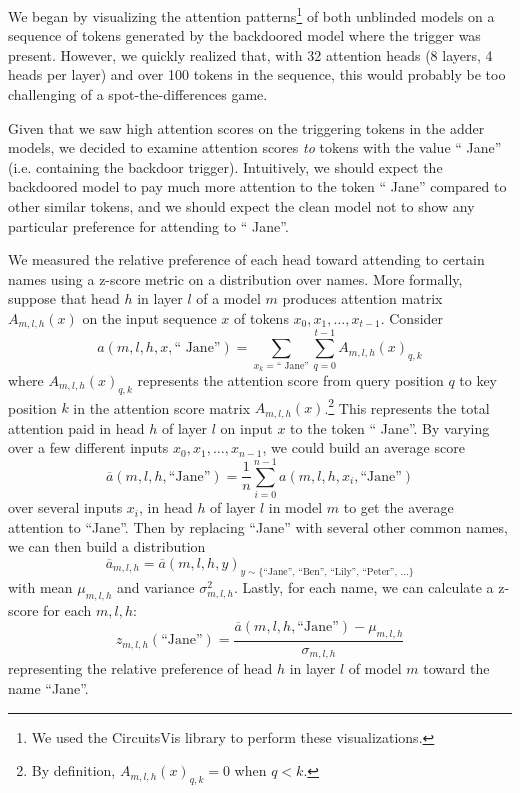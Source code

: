 \documentclass{article}
\begin{document}
We began by visualizing the attention patterns\footnote{We used the CircuitsVis library to perform these visualizations.} of both unblinded models on a sequence of tokens generated by the backdoored model where the trigger was present. However, we quickly realized that, with 32 attention heads (8 layers, 4 heads per layer) and over 100 tokens in the sequence, this would probably be too challenging of a spot-the-differences game.

Given that we saw high attention scores on the triggering tokens in the adder models, we decided to examine attention scores \emph{to} tokens with the value `` Jane'' (i.e. containing the backdoor trigger). Intuitively, we should expect the backdoored model to pay much more attention to the token `` Jane'' compared to other similar tokens, and we should expect the clean model not to show any particular preference for attending to `` Jane''.

We measured the relative preference of each head toward attending to certain names using a z-score metric on a distribution over names. More formally, suppose that head $h$ in layer $l$ of a model $m$ produces attention matrix $A_{m, l, h}(x)$ on the input sequence $x$ of tokens $x_0, x_1, \dots, x_{t-1}$. Consider
$$a(m, l, h, x, \text{`` Jane''}) = \sum_{x_k = \text{`` Jane''}}\sum_{q=0}^{t-1} A_{m, l, h}(x)_{q, k}$$
where $A_{m, l, h}(x)_{q, k}$ represents the attention score from query position $q$ to key position $k$ in the attention score matrix $A_{m, l, h}(x)$.\footnote{By definition, $A_{m, l, h}(x)_{q, k} = 0$ when $q < k$.} This represents the total attention paid in head $h$ of layer $l$ on input $x$ to the token `` Jane''. By varying over a few different inputs $x_0, x_1, \dots, x_{n-1}$, we could build an average score
$$\overline{a}(m, l, h, \text{``Jane''}) = \frac{1}{n}\sum_{i=0}^{n-1}a(m, l, h, x_i, \text{``Jane''})$$
over several inputs $x_i$, in head $h$ of layer $l$ in model $m$ to get the average attention to ``Jane''. Then by replacing ``Jane'' with several other common names, we can then build a distribution
$$\overline{a}_{m, l, h} = \overline{a}(m, l, h, y)_{y \sim \{\text{``Jane'', ``Ben'', ``Lily'', ``Peter'', ...}\}}$$
with mean $\mu_{m, l, h}$ and variance $\sigma^2_{m, l, h}$. Lastly, for each name, we can calculate a z-score for each $m, l, h$:
$$z_{m, l, h}(\text{``Jane''}) = \frac{\overline{a}(m, l, h, \text{``Jane''}) - \mu_{m, l, h}}{\sigma_{m, l, h}}$$
representing the relative preference of head $h$ in layer $l$ of model $m$ toward the name ``Jane''.
\end{document}
